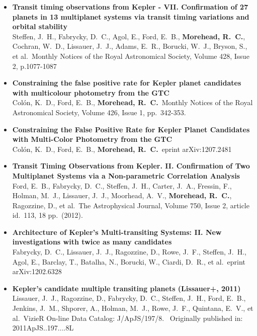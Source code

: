 \documentclass[11pt,letterpaper,sans]{moderncv} %
\begin{document}
\begin{itemize}
 \item \textbf{ Transit timing observations from Kepler - VII. Confirmation 
of 27 planets in 13 multiplanet systems via transit timing variations and 
orbital stability } \\ Steffen, J.~H., Fabrycky, D.~C., Agol, E., Ford, 
E.~B., \textbf{Morehead, R.~C.}, Cochran, W.~D., Lissauer, J.~J., Adams, E.~R., 
Borucki, W.~J., Bryson, S., et al.\ Monthly Notices of the Royal 
Astronomical Society, Volume 428, Issue 2, p.1077-1087 \\ 

 \item \textbf{ Constraining the false positive rate for Kepler planet 
candidates with multicolour photometry from the GTC } \\ Col{\'o}n, K.~D., 
Ford, E.~B., \textbf{Morehead, R.~C.}\ Monthly Notices of the Royal Astronomical 
Society, Volume 426, Issue 1, pp.~342-353.\ \\ 

 \item \textbf{ Constraining the False Positive Rate for Kepler Planet 
Candidates with Multi-Color Photometry from the GTC } \\ Col{\'o}n, K.~D., 
Ford, E.~B., \textbf{Morehead, R.~C.}\ eprint arXiv:1207.2481 \\ 

 \item \textbf{ Transit Timing Observations from Kepler. II. Confirmation 
of Two Multiplanet Systems via a Non-parametric Correlation Analysis } \\ 
Ford, E.~B., Fabrycky, D.~C., Steffen, J.~H., Carter, J.~A., Fressin, F., 
Holman, M.~J., Lissauer, J.~J., Moorhead, A.~V., \textbf{Morehead, R.~C.}, 
Ragozzine, D., et al.\ The Astrophysical Journal, Volume 750, Issue 2, 
article id.~113, 18 pp.~(2012).\ \\ 

 \item \textbf{ Architecture of Kepler's Multi-transiting Systems: II. New 
investigations with twice as many candidates } \\ Fabrycky, D.~C., 
Lissauer, J.~J., Ragozzine, D., Rowe, J.~F., Steffen, J.~H., Agol, E., 
Barclay, T., Batalha, N., Borucki, W., Ciardi, D.~R., et al.\ eprint 
arXiv:1202.6328 \\ 


 \item \textbf{ Kepler's candidate multiple transiting planets (Lissauer+, 
2011) } \\ Lissauer, J.~J., Ragozzine, D., Fabrycky, D.~C., Steffen, J.~H., 
Ford, E.~B., Jenkins, J.~M., Shporer, A., Holman, M.~J., Rowe, J.~F., 
Quintana, E.~V., et al.\ VizieR On-line Data Catalog: J/ApJS/197/8.~ 
Originally published in: 2011ApJS..197....8L \\ 


\end{itemize}
\end{document}
